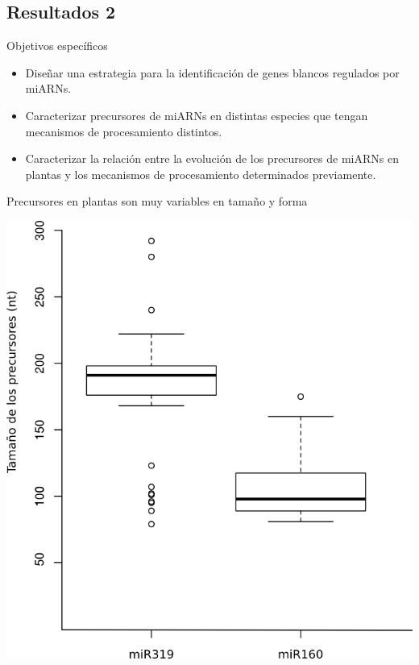 \documentclass{beamer}
\begin{document}
\subsection{Resultados 2}

\begin{frame}{Objetivos específicos}
		\pause
		\begin{itemize}
            \item<-1> Diseñar una estrategia para la identificación de genes blancos regulados por miARNs.
			\item<-2> Caracterizar precursores de miARNs en distintas especies que tengan mecanismos de procesamiento distintos.
			\item<-1> Caracterizar la relación entre la evolución de los precursores de miARNs en plantas y los mecanismos de procesamiento determinados previamente.
        \end{itemize}
\end{frame}


\begin{frame}{Precursores en plantas son muy variables en tamaño y forma}
	\begin{center}
		\includegraphics[width=.5\textwidth]{img/hairpin_distribution.png}
	\end{center}
\end{frame}
\end{document}

